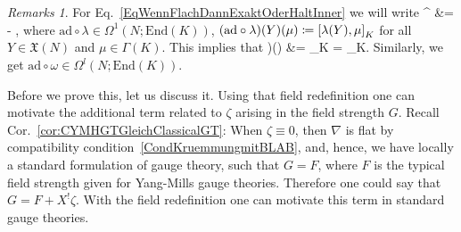 \documentclass[preprint]{elsarticle}
\def\ba#1\ea{\begin{align}#1\end{align}}
\def\bas#1\eas{\begin{align*}#1\end{align*}}
\theoremstyle{plain}
\theoremstyle{remark}
\newtheorem{remark}[theorem]{Remarks}
\theoremstyle{definition}
\begin{document}
\begin{remark}
\leavevmode\newline
For Eq.~\eqref{EqWennFlachDannExaktOderHaltInner} we will write 
\ba
\widetilde{\nabla}^\lambda
&=
\nabla
-  \circ \lambda,
\ea
where $\mathrm{ad} \circ \lambda \in \Omega^1(N; \mathrm{End}(K))$, $\mleft(\mathrm{ad} \circ \lambda \mright)(Y)(\mu) \coloneqq \mleft[ \lambda(Y), \mu \mright]_K$ for all $Y \in \mathfrak{X}(N)$ and $\mu \in \Gamma(K)$. This implies that 
\bas
( \circ \lambda)(\mu)
&=
\mleft[ \lambda, \mu \mright]_K
=
\mleft[ \lambda \stackrel{\wedge}{,} \mu \mright]_K.
\eas
Similarly, we get $\mathrm{ad} \circ \omega \in \Omega^l(N; \mathrm{End}(K))$.
\end{remark}

Before we prove this, let us discuss it. Using that field redefinition one can motivate the additional term related to $\zeta$ arising in the field strength $G$. Recall Cor.~\ref{cor:CYMHGTGleichClassicalGT}: When $\zeta \equiv 0$, then $\nabla$ is flat by compatibility condition~\eqref{CondKruemmungmitBLAB}, and, hence, we have locally a standard formulation of gauge theory, such that $G = F$, where $F$ is the typical field strength given for Yang-Mills gauge theories. Therefore one could say that $G = F +X^!\zeta$. With the field redefinition one can motivate this term in standard gauge theories.
\end{document}
